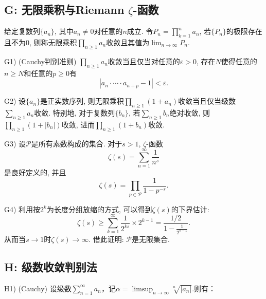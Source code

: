 \subsection*{G: 无限乘积与Riemann $\zeta$-函数}


给定复数列$\{ a_n \}$, 其中$a_n \neq 0$对任意的$n$成立. 令$P_n = \prod_{k=1}^{n} a_n$, 若$\{ P_n \}$的极限存在且不为$0$, 则称无限乘积$\prod_{n \geq 1}a_n$收敛且其值为$\lim_{n \to \infty} P_n$. 

G1) (Cauchy判别准则) $\prod_{n \geq 1}a_n$收敛当且仅当对任意的$\varepsilon >0$, 存在$N$使得任意的$n \geq N$和任意的$p \geq 0$有$$|a_n \cdot \cdots \cdot a_{n+p}-1|<\varepsilon .$$

G2) 设$\{ a_n \}$是正实数序列, 则无限乘积$\prod_{n \geq 1} (1+a_n)$收敛当且仅当级数$\sum_{n\geq 1}a_n$收敛. 特别地, 对于复数列$\{ b_n \}$, 若$\sum_{n\geq 1}b_n$绝对收敛, 则$\prod_{n \geq 1} (1+|b_n|)$收敛, 进而$\prod_{n \geq 1} (1+b_n)$收敛. 

G3) 设$\mathcal{P}$是所有素数构成的集合. 对于$s>1$, $\zeta$-函数$$\zeta (s) = \sum_{n=1}^{\infty} \frac{1}{n^s}$$
是良好定义的, 并且$$\zeta (s) = \prod_{p \in \mathcal{P}} \frac{1}{1-p^{-s}}. $$

G4) 利用按$2^k$为长度分组放缩的方式, 可以得到$\zeta (s)$的下界估计: $$\zeta (s) \geq \sum_{k=1}^{\infty} \frac{1}{2^{ks}} \times 2^{k-1} = \frac{1/2}{1-\frac{1}{2^{s-1}}}.$$
从而当$s \to 1$时$\zeta (s) \to \infty$. 借此证明: $\mathcal{P}$是无限集合. 

\subsection*{H: 级数收敛判别法}


H1) (Cauchy) 设级数$\sum_{n=1}^{\infty} a_n$，记$\alpha = \limsup_{n\to \infty} \sqrt[n]{|a_n|}$.则有：
	
